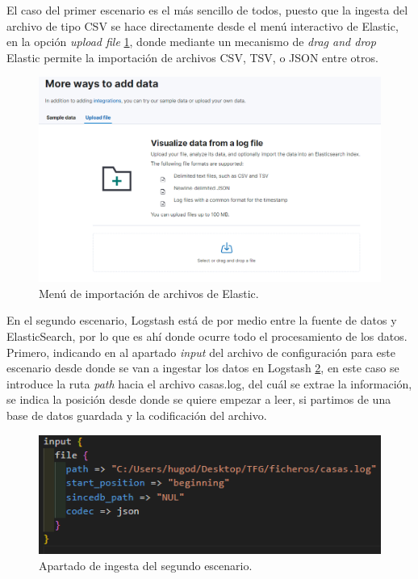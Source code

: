 El caso del primer escenario es el más sencillo de todos, puesto que la ingesta del archivo de tipo CSV se hace directamente desde el menú interactivo de Elastic, en la opción \textit{upload file} \ref{fig:ingesta1}, donde mediante un mecanismo de \textit{drag and drop} Elastic permite la importación de archivos CSV, TSV, o JSON entre otros. 

\begin{figure}
    \centering
    \includegraphics[width=1\linewidth]{img/ingesta1.png}
    \caption{Menú de importación de archivos de Elastic.}
    \label{fig:ingesta1}
\end{figure}

En el segundo escenario, Logstash está de por medio entre la fuente de datos y ElasticSearch, por lo que es ahí donde ocurre todo el procesamiento de los datos. Primero, indicando en al apartado \textit{input} del archivo de configuración para este escenario desde donde se van a ingestar los datos en Logstash \ref{fig:ingesta2}, en este caso se introduce la ruta \textit{path} hacia el archivo casas.log, del cuál se extrae la información, se indica la posición desde donde se quiere empezar a leer, si partimos de una base de datos guardada y la codificación del archivo.

\begin{figure}
    \centering
    \includegraphics[width=1\linewidth]{img/ingesta2.png}
    \caption{Apartado de ingesta del segundo escenario.}
    \label{fig:ingesta2}
\end{figure}

